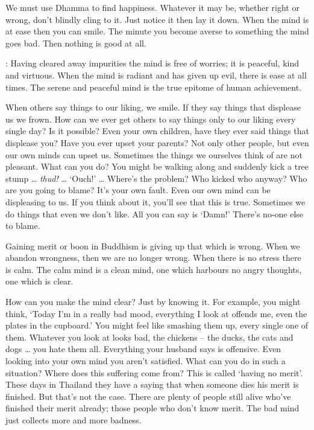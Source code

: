 We must use Dhamma to find happiness. Whatever it may be, whether right or wrong, don't blindly cling to it. Just notice it then lay it down. When the mind is at ease then you can smile. The minute you become averse to something the mind goes bad. Then nothing is good at all.

: Having cleared away impurities the mind is free of worries; it is peaceful, kind and virtuous. When the mind is radiant and has given up evil, there is ease at all times. The serene and peaceful mind is the true epitome of human achievement.

When others say things to our liking, we smile. If they say things that displease us we frown. How can we ever get others to say things only to our liking every single day? Is it possible? Even your own children, have they ever said things that displease you? Have you ever upset your parents? Not only other people, but even our own minds can upset us. Sometimes the things we ourselves think of are not pleasant. What can you do? You might be walking along and suddenly kick a tree stump \ldots{} \textit{thud!} \ldots{} `Ouch!' \ldots{} Where's the problem? Who kicked who anyway? Who are you going to blame? It's your own fault. Even our own mind can be displeasing to us. If you think about it, you'll see that this is true. Sometimes we do things that even we don't like. All you can say is `Damn!' There's no-one else to blame.

Gaining merit or boon in Buddhism is giving up that which is wrong. When we abandon wrongness, then we are no longer wrong. When there is no stress there is calm. The calm mind is a clean mind, one which harbours no angry thoughts, one which is clear.

How can you make the mind clear? Just by knowing it. For example, you might think, `Today I'm in a really bad mood, everything I look at offends me, even the plates in the cupboard.' You might feel like smashing them up, every single one of them. Whatever you look at looks bad, the chickens -- the ducks, the cats and dogs \ldots{} you hate them all. Everything your husband says is offensive. Even looking into your own mind you aren't satisfied. What can you do in such a situation? Where does this suffering come from? This is called `having no merit'. These days in Thailand they have a saying that when someone dies his merit is finished. But that's not the case. There are plenty of people still alive who've finished their merit already; those people who don't know merit. The bad mind just collects more and more badness.

